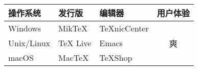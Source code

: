 \centering
\begin{tabular}{lllc}
  \toprule
  操作系统 & 发行版 & 编辑器 & 用户体验\\
  \midrule
  Windows & MikTeX & TeXnicCenter & 
  \multirow{3}{*}{\centering 爽} \\
  Unix/Linux & TeX Live & Emacs \\
  macOS  & MacTeX & TeXShop \\
  \bottomrule
\end{tabular}

